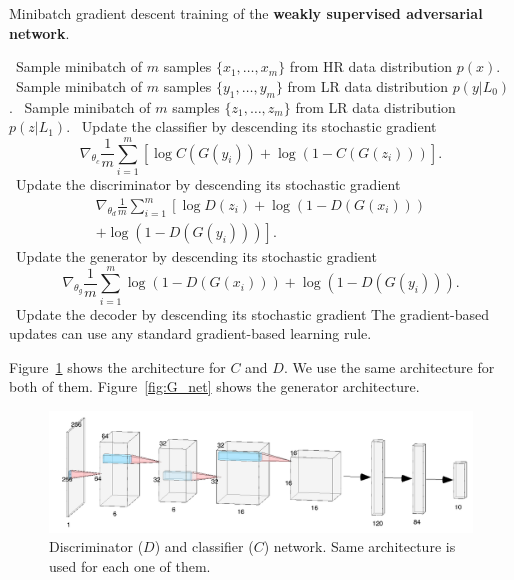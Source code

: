 \documentclass[10pt,twocolumn,letterpaper]{article}
\newcommand{\stateb}{\STATE \textbullet~}
\begin{document}
\begin{algorithm}[h]
    \caption{Minibatch gradient descent training of the \textbf{weakly supervised adversarial network}.}
    \label{alg:srcgan}
    \begin{algorithmic}
    \stateb Sample minibatch of $m$ samples $\{x_1,\ldots, x_m\}$ from HR data distribution $p(x)$.
    \stateb Sample minibatch of $m$ samples $\{y_1,\ldots, y_m\}$ from LR data distribution $p(y|L_0)$.
    \stateb Sample minibatch of $m$ samples $\{z_1,\ldots, z_m\}$ from LR data distribution $p(z|L_1)$.
    \stateb Update the classifier by descending its stochastic gradient
    \[\nabla_{\theta_c} \frac{1}{m} \sum_{i=1}^m \left[\log C(G(y_i)) + \log(1 - C(G(z_i))) \right]. \]
    \stateb Update the discriminator by descending its stochastic gradient
    \[
    \begin{aligned}
    \nabla_{\theta_d} \frac{1}{m} \sum_{i=1}^m \left[\log D(z_i) + \log(1- D(G(x_i))) \right. \\ \left. + \log(1- D(G(y_i))) \right].
    \end{aligned}
    \]
    \stateb Update the generator by descending its stochastic gradient
    \[
    \nabla_{\theta_{g}} \frac{1}{m} \sum_{i=1}^m \log(1- D(G(x_i)))+\log(1- D(G(y_i))).\]
    \stateb Update the decoder by descending its stochastic gradient
    \ENDFOR
    \STATE The gradient-based updates can use any standard gradient-based learning rule.
    \end{algorithmic}
\end{algorithm}


Figure~\ref{fig:D_net} shows the architecture for $C$ and $D.$ We use the same architecture for both of them. Figure~\ref{fig:G_net} shows the generator architecture.

\begin{figure}[h]
\begin{center}
\includegraphics[scale=0.35]{D_net.png}
\end{center}
   \caption{Discriminator ($D$) and classifier ($C$) network. Same architecture is used for each one of them.}
\label{fig:D_net}
\end{figure}
\end{document}
